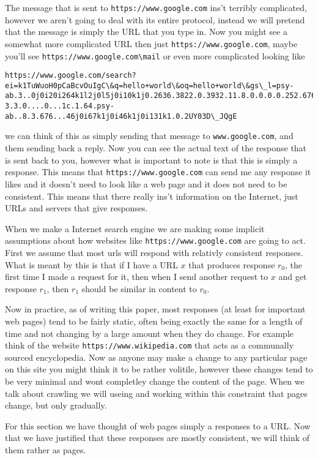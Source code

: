 \documentclass{article}
\begin{document}
	The message that is sent to \verb|https://www.google.com| ins't terribly complicated, however we aren't going to deal with its entire protocol, instead we will pretend that the message is simply the URL that you type in. Now you might see a somewhat more complicated URL then just \verb|https://www.google.com|, maybe you'll see \verb|https://www.google.com\mail| or even more complicated looking like
	\begin{lstlisting}[breaklines]
	https://www.google.com/search?ei=k1TuWuoH0pCaBcvOuIgC\&q=hello+world\&oq=hello+world\&gs\_l=psy-ab.3..0j0i20i264k1l2j0l5j0i10k1j0.2636.3822.0.3932.11.8.0.0.0.0.252.676.2-3.3.0....0...1c.1.64.psy-ab..8.3.676...46j0i67k1j0i46k1j0i131k1.0.2UY03D\_JQgE
	\end{lstlisting}
	we can think of this as simply sending that message to \verb|www.google.com|, and them sending back a reply. Now you can see the actual text of the response that is sent back to you, however what is important to note is that this is simply a response. This means that \verb|https://www.google.com| can send me any response it likes and it doesn't need to look like a web page and it does not need to be consistent. This means that there really ins't information on the Internet, just URLs and servers that give responses.
	
	When we make a Internet search engine we are making some implicit assumptions about how websites like \verb|https://www.google.com| are going to act. First we assume that most urls will respond with relativly consistent responses. What is meant by this is that if I have a URL $x$ that produces response $r_0$, the first time I made a request for it, then when I send another request to $x$ and get response $r_1$, then $r_1$ should be similar in content to $r_0$.
	
	Now in practice, as of writing this paper, most responses (at least for important web pages) tend to be fairly static, often being exactly the same for a length of time and not changing by a large amount when they do change. For example think of the website \verb|https://www.wikipedia.com| that acts as a communally sourced encyclopedia. Now as anyone may make a change to any particular page on this site you might think it to be rather  volitile, however these changes tend to be very minimal and wont completley change the content of the page. When we talk about crawling we will useing and working within this constraint that pages change, but only gradually.
	
	For this section we have thought of web pages simply a responses to a URL. Now that we have justified that these responses are mostly consistent, we will think of them rather as pages.
	
\end{document}
